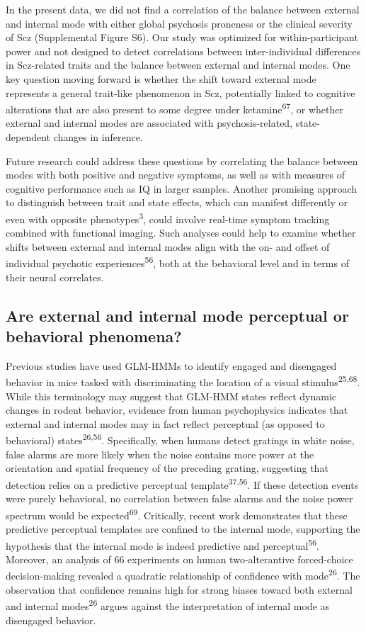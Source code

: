\documentclass[
]{article}
\begin{document}
In the present data, we did not find a correlation of the balance
between external and internal mode with either global psychosis
proneness or the clinical severity of Scz (Supplemental Figure S6). Our
study was optimized for within-participant power and not designed to
detect correlations between inter-individual differences in Scz-related
traits and the balance between external and internal modes. One key
question moving forward is whether the shift toward external mode
represents a general trait-like phenomenon in Scz, potentially linked to
cognitive alterations that are also present to some degree under
ketamine\textsuperscript{67}, or whether external and internal modes are
associated with psychosis-related, state-dependent changes in inference.

Future research could address these questions by correlating the balance
between modes with both positive and negative symptoms, as well as with
measures of cognitive performance such as IQ in larger samples. Another
promising approach to distinguish between trait and state effects, which
can manifest differently or even with opposite
phenotypes\textsuperscript{3}, could involve real-time symptom tracking
combined with functional imaging. Such analyses could help to examine
whether shifts between external and internal modes align with the on-
and offset of individual psychotic experiences\textsuperscript{56}, both
at the behavioral level and in terms of their neural correlates.

\subsection{Are external and internal mode perceptual or behavioral
phenomena?}\label{are-external-and-internal-mode-perceptual-or-behavioral-phenomena}

Previous studies have used GLM-HMMs to identify engaged and disengaged
behavior in mice tasked with discriminating the location of a visual
stimulus\textsuperscript{25,68}. While this terminology may suggest that
GLM-HMM states reflect dynamic changes in rodent behavior, evidence from
human psychophysics indicates that external and internal modes may in
fact reflect perceptual (as opposed to behavioral)
states\textsuperscript{26,56}. Specifically, when humans detect gratings
in white noise, false alarms are more likely when the noise contains
more power at the orientation and spatial frequency of the preceding
grating, suggesting that detection relies on a predictive perceptual
template\textsuperscript{37,56}. If these detection events were purely
behavioral, no correlation between false alarms and the noise power
spectrum would be expected\textsuperscript{69}. Critically, recent work
demonstrates that these predictive perceptual templates are confined to
the internal mode, supporting the hypothesis that the internal mode is
indeed predictive and perceptual\textsuperscript{56}. Moreover, an
analysis of 66 experiments on human two-alterantive forced-choice
decision-making revealed a quadratic relationship of confidence with
mode\textsuperscript{26}. The observation that confidence remains high
for strong biases toward both external and internal
modes\textsuperscript{26} argues against the interpretation of internal
mode as disengaged behavior.
\end{document}
